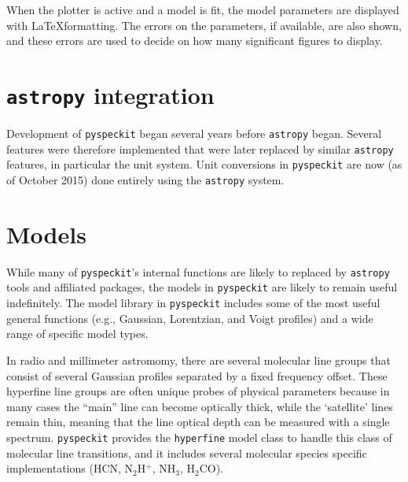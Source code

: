\documentclass[twocolumn]{aastex61}
\newcommand{\pyspeckit}{\texttt{pyspeckit}\xspace}
\newcommand{\astropy}{\texttt{astropy}\xspace}
\begin{document}
When the plotter is active and a model is fit, the model parameters are
displayed with \LaTeX formatting.  The errors on the parameters, if available,
are also shown, and these errors are used to decide on how many significant
figures to display.

\section{\astropy integration}
Development of \pyspeckit began several years before \astropy began.  Several
features were therefore implemented that were later replaced by similar
\astropy features, in particular the unit system.  Unit conversions in
\pyspeckit are now (as of October 2015) done entirely using the \astropy
system.

\section{Models}
While many of \pyspeckit's internal functions are likely to replaced by
\astropy tools and affiliated packages, the models in \pyspeckit are likely to
remain useful indefinitely.  The model library in \pyspeckit includes some of
the most useful general functions (e.g., Gaussian, Lorentzian, and Voigt
profiles) and a wide range of specific model types.

In radio and millimeter astromomy, there are several molecular line groups that
consist of several Gaussian profiles separated by a fixed frequency offset.
These hyperfine line groups are often unique probes of physical parameters
because in many cases the ``main'' line can become optically thick, while the
`satellite' lines remain thin, meaning that the line optical depth can be
measured with a single spectrum.  \pyspeckit provides the \texttt{hyperfine}
model class to handle this class of molecular line transitions, and it includes
several molecular species specific implementations (HCN, N$_2$H$^+$, NH$_3$,
H$_2$CO).


\end{document}
